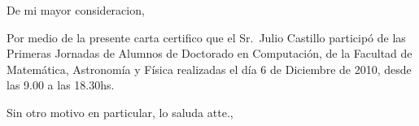 \documentclass[12pt,a4paper]{article}
\date{C\'ordoba, 6 de diciembre de 2010}
\begin{document}
\opening{De mi mayor consideracion,}

Por medio de la presente carta certifico que el Sr.\ Julio Castillo particip\'o de las Primeras Jornadas 
de Alumnos de Doctorado en Computaci\'on, de la Facultad de Matem\'atica, Astronom\'ia y 
F\'isica realizadas el d\'ia 6 de Diciembre de 2010, desde las 9.00 a las 18.30hs. 

\closing{Sin otro motivo en particular, lo saluda atte.,}
\end{document}

